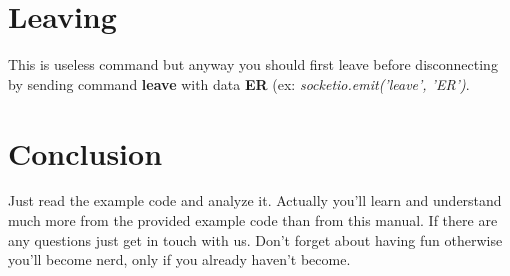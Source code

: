 \documentclass[10pt]{article}
\begin{document}
\section{Leaving}
This is useless command but anyway you should first leave before disconnecting by sending command \textbf{leave} with data \textbf{ER} (ex: \textit{socketio.emit('leave', 'ER')}.

\section{Conclusion}
Just read the example code and analyze it. Actually you'll learn and understand much more from the provided example code than from this manual. If there are any questions just get in touch with us. Don't forget about having fun otherwise you'll become nerd, only if you already haven't become.
\end{document}

